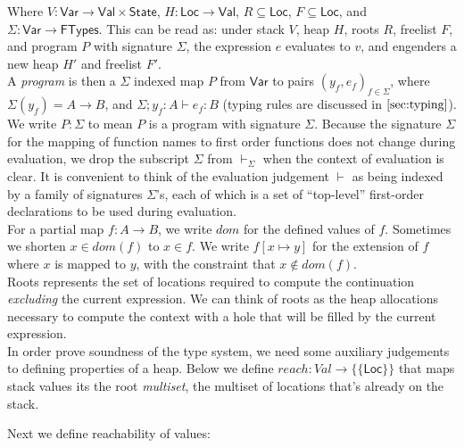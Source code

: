 \documentclass[sigconf]{acmart}
\newcommand{\ms}[1]{\ensuremath{\mathsf{#1}}}
\newcounter{rule}
\theoremstyle{definition}
\begin{document}
\noindent
Where $V : \ms{Var} \to \ms{Val} \times \ms{State}$, $H : \ms{Loc} \to \ms{Val}$, $R \subseteq \ms{Loc}$, $F \subseteq \ms{Loc}$, and $\Sigma : \ms{Var} \to \ms{FTypes}$. This can be read as: under stack $V$, heap $H$, roots $R$,
freelist $F$, and program $P$ with signature $\Sigma$, the expression $e$ evaluates to $v$, and engenders a new heap $H'$ and freelist $F'$.\\

\noindent
A \emph{program} is then a $\Sigma$ indexed map $P$ from $\ms{Var}$ to pairs $(y_f,e_f)_{f \in \Sigma}$, where $\Sigma(y_f) = A \to B$, and $\Sigma;y_f : A \vdash e_f : B$ (typing rules are discussed in $\ref{sec:typing}$). We write $P : \Sigma$ to mean $P$ is a program with signature $\Sigma$. Because the signature $\Sigma$ for the mapping of function names to first order functions does not change during evaluation, we drop the subscript $\Sigma$ from $\vdash_{\Sigma}$ when the context of evaluation is clear. It is convenient to think of the evaluation judgement $\vdash$ as being indexed by a family of signatures $\Sigma$'s, each of which is a set of ``top-level'' first-order declarations to be used during evaluation.\\

\noindent 
For a partial map $f : A \to B$, we write $dom$ for the defined values of $f$. Sometimes we shorten $x \in dom(f)$ to $x \in f$. We write $f[x \mapsto y]$ for the extension of $f$ where $x$ is mapped to $y$, with the constraint that $x \notin dom(f)$. \\

\noindent
Roots represents the set of locations required to compute the continuation \emph{excluding} the current expression.
We can think of roots as the heap allocations necessary to compute the context with a hole that will be filled
by the current expression.\\

\noindent
In order prove soundness of the type system, we need some auxiliary judgements to defining properties of a heap. Below we define $reach : Val \to \{\{\ms{Loc}\}\}$ that maps stack values its the root \emph{multiset}, the multiset of locations that's already on the stack. 

\noindent
Next we define reachability of values:
\end{document}
